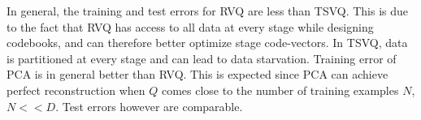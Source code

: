 In general, the training and test errors for RVQ are less than TSVQ. This is due to the fact that RVQ has access to all data at every stage while designing codebooks, and can therefore better optimize stage code-vectors. In TSVQ, data is partitioned at every stage and can lead to data starvation.
Training error of PCA is in general better than RVQ. This is expected since PCA can achieve perfect reconstruction when $Q$ comes close to the number of training examples $N$, $N<<D$. Test errors however are comparable.
%
